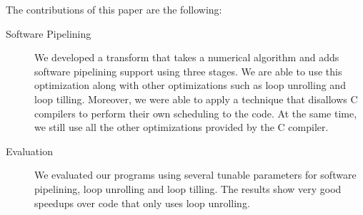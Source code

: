 \documentclass[10pt]{article}
\begin{document}
The contributions of this paper are the following:

\begin{description}
   \item[Software Pipelining] We developed a transform that takes a numerical algorithm and adds software pipelining support
   using three stages. We are able to use this optimization along with other optimizations such as loop unrolling and loop tilling.
   Moreover, we were able to apply a technique that disallows C compilers to perform their own scheduling to the code. At the same
   time, we still use all the other optimizations provided by the C compiler. 
   \item[Evaluation] We evaluated our programs using several tunable parameters for software pipelining,
   loop unrolling and loop tilling. The results show very good speedups over code that only uses loop unrolling.
\end{description}

\end{document}
